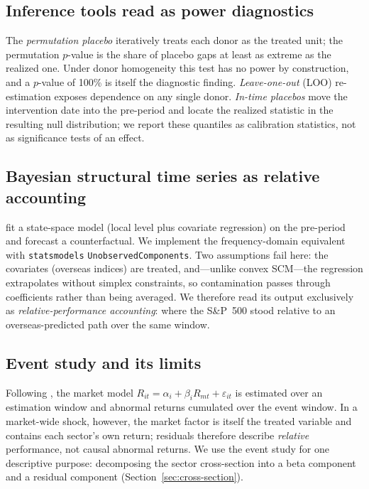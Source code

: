 \documentclass[11pt,a4paper]{article}
\begin{document}
\subsection{Inference tools read as power diagnostics}\label{sec:inference}

The \emph{permutation placebo} \citep{abadie2021} iteratively treats each
donor as the treated unit; the permutation $p$-value is the share of
placebo gaps at least as extreme as the realized one. Under donor
homogeneity this test has no power by construction, and a $p$-value of
100\% is itself the diagnostic finding. \emph{Leave-one-out} (LOO)
re-estimation exposes dependence on any single donor. \emph{In-time
placebos} move the intervention date into the pre-period and locate the
realized statistic in the resulting null distribution; we report these
quantiles as calibration statistics, not as significance tests of an
effect.

\subsection{Bayesian structural time series as relative accounting}
\label{sec:bsts}

\citet{brodersen2015} fit a state-space model (local level plus covariate
regression) on the pre-period and forecast a counterfactual. We implement
the frequency-domain equivalent with \texttt{statsmodels}
\texttt{UnobservedComponents}. Two assumptions fail here: the covariates
(overseas indices) are treated, and---unlike convex SCM---the regression
extrapolates without simplex constraints, so contamination passes through
coefficients rather than being averaged. We therefore read its output
exclusively as \emph{relative-performance accounting}: where the S\&P~500
stood relative to an overseas-predicted path over the same window.

\subsection{Event study and its limits}\label{sec:es-method}

Following \citet{mackinlay1997}, the market model
$R_{it} = \alpha_i + \beta_i R_{mt} + \varepsilon_{it}$ is estimated over
an estimation window and abnormal returns cumulated over the event window.
In a market-wide shock, however, the market factor is itself the treated
variable and contains each sector's own return; residuals therefore
describe \emph{relative} performance, not causal abnormal returns. We use
the event study for one descriptive purpose: decomposing the sector
cross-section into a beta component and a residual component
(Section~\ref{sec:cross-section}).
\end{document}
